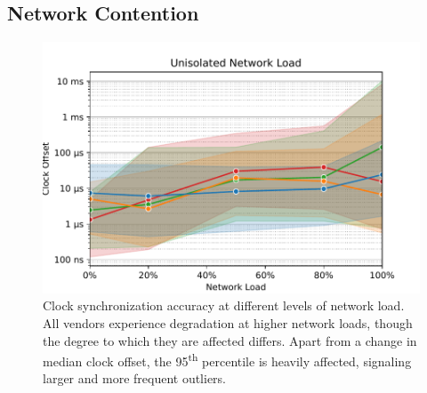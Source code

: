 \subsection{Network Contention}
\begin{figure}
    \includegraphics[width=\linewidth]{res/generated/net_unprioritized_trend_rpi-4.pdf}
    \caption{Clock synchronization accuracy at different levels of network load. All vendors experience degradation at higher network loads, though the degree to which they are affected differs. Apart from a change in median clock offset, the 95\textsuperscript{th} percentile is heavily affected, signaling larger and more frequent outliers.}
    \label{fig:network_load}
\end{figure}


